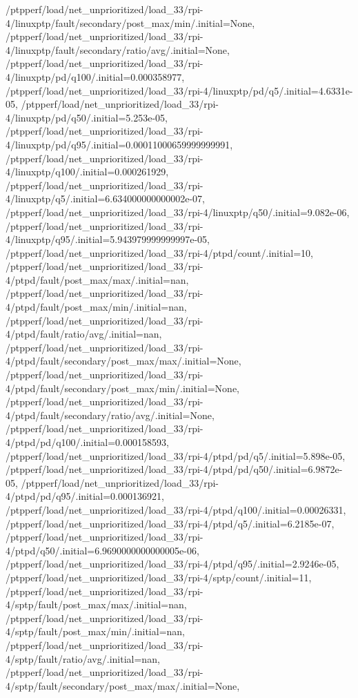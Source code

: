 {    /ptpperf/load/net_unprioritized/load_33/rpi-4/linuxptp/fault/secondary/post_max/min/.initial=None,
    /ptpperf/load/net_unprioritized/load_33/rpi-4/linuxptp/fault/secondary/ratio/avg/.initial=None,
    /ptpperf/load/net_unprioritized/load_33/rpi-4/linuxptp/pd/q100/.initial=0.000358977,
    /ptpperf/load/net_unprioritized/load_33/rpi-4/linuxptp/pd/q5/.initial=4.6331e-05,
    /ptpperf/load/net_unprioritized/load_33/rpi-4/linuxptp/pd/q50/.initial=5.253e-05,
    /ptpperf/load/net_unprioritized/load_33/rpi-4/linuxptp/pd/q95/.initial=0.00011000659999999991,
    /ptpperf/load/net_unprioritized/load_33/rpi-4/linuxptp/q100/.initial=0.000261929,
    /ptpperf/load/net_unprioritized/load_33/rpi-4/linuxptp/q5/.initial=6.634000000000002e-07,
    /ptpperf/load/net_unprioritized/load_33/rpi-4/linuxptp/q50/.initial=9.082e-06,
    /ptpperf/load/net_unprioritized/load_33/rpi-4/linuxptp/q95/.initial=5.943979999999997e-05,
    /ptpperf/load/net_unprioritized/load_33/rpi-4/ptpd/count/.initial=10,
    /ptpperf/load/net_unprioritized/load_33/rpi-4/ptpd/fault/post_max/max/.initial=nan,
    /ptpperf/load/net_unprioritized/load_33/rpi-4/ptpd/fault/post_max/min/.initial=nan,
    /ptpperf/load/net_unprioritized/load_33/rpi-4/ptpd/fault/ratio/avg/.initial=nan,
    /ptpperf/load/net_unprioritized/load_33/rpi-4/ptpd/fault/secondary/post_max/max/.initial=None,
    /ptpperf/load/net_unprioritized/load_33/rpi-4/ptpd/fault/secondary/post_max/min/.initial=None,
    /ptpperf/load/net_unprioritized/load_33/rpi-4/ptpd/fault/secondary/ratio/avg/.initial=None,
    /ptpperf/load/net_unprioritized/load_33/rpi-4/ptpd/pd/q100/.initial=0.000158593,
    /ptpperf/load/net_unprioritized/load_33/rpi-4/ptpd/pd/q5/.initial=5.898e-05,
    /ptpperf/load/net_unprioritized/load_33/rpi-4/ptpd/pd/q50/.initial=6.9872e-05,
    /ptpperf/load/net_unprioritized/load_33/rpi-4/ptpd/pd/q95/.initial=0.000136921,
    /ptpperf/load/net_unprioritized/load_33/rpi-4/ptpd/q100/.initial=0.00026331,
    /ptpperf/load/net_unprioritized/load_33/rpi-4/ptpd/q5/.initial=6.2185e-07,
    /ptpperf/load/net_unprioritized/load_33/rpi-4/ptpd/q50/.initial=6.9690000000000005e-06,
    /ptpperf/load/net_unprioritized/load_33/rpi-4/ptpd/q95/.initial=2.9246e-05,
    /ptpperf/load/net_unprioritized/load_33/rpi-4/sptp/count/.initial=11,
    /ptpperf/load/net_unprioritized/load_33/rpi-4/sptp/fault/post_max/max/.initial=nan,
    /ptpperf/load/net_unprioritized/load_33/rpi-4/sptp/fault/post_max/min/.initial=nan,
    /ptpperf/load/net_unprioritized/load_33/rpi-4/sptp/fault/ratio/avg/.initial=nan,
    /ptpperf/load/net_unprioritized/load_33/rpi-4/sptp/fault/secondary/post_max/max/.initial=None,
}
